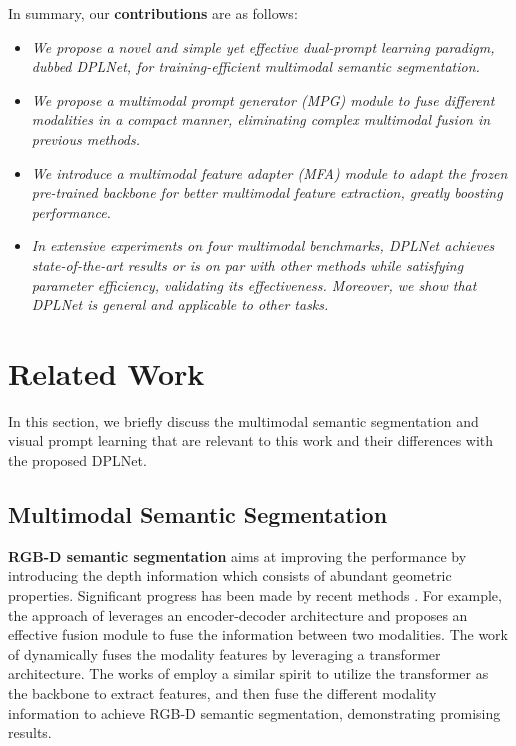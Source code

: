 \documentclass[10pt,twocolumn,letterpaper]{article}
\begin{document}
In summary, our \textbf{contributions} are as follows:
\vspace{0.1em}
\begin{itemize}
\setlength{\itemsep}{2pt}
\setlength{\parsep}{2pt}
\setlength{\parskip}{2pt}

      \item[] \emph{We propose a novel and simple yet effective dual-prompt learning paradigm, dubbed DPLNet, for training-efficient multimodal semantic segmentation.
      }
      
      \item[] \emph{We propose a multimodal prompt generator (MPG) module to fuse different modalities in a compact manner, eliminating complex multimodal fusion in previous methods.}

      \item[] \emph{We introduce a multimodal feature adapter (MFA) module to adapt the frozen pre-trained backbone for better multimodal feature extraction, greatly boosting performance.}
      
      \item[] \emph{In extensive experiments on four multimodal benchmarks, DPLNet achieves state-of-the-art results or is on par with other methods while satisfying parameter efficiency, validating its effectiveness. Moreover, we show that DPLNet is general and applicable to other tasks.}
\end{itemize}



\section{Related Work}
\label{sec:rel}

In this section, we briefly discuss the multimodal semantic segmentation and visual prompt learning that are relevant to this work and their differences with the proposed DPLNet.

\subsection{Multimodal Semantic Segmentation}

\noindent
\textbf{RGB-D semantic segmentation} aims at improving the performance by introducing the depth information which consists of abundant geometric properties. Significant progress has been made by recent methods \cite{acnet, SGNet, SA-gate, cen, shapeconv, frnet, pgdenet, tokenfusion, multimae, omnivore, CMX, CMNext}. For example, the approach of \cite{acnet} leverages an encoder-decoder architecture and proposes an effective fusion module to fuse the information between two modalities. The work of \cite{tokenfusion} dynamically fuses the modality features by leveraging a transformer architecture. The works of \cite{CMX,CMNext} employ a similar spirit to utilize the transformer as the backbone to extract features, and then fuse the different modality information to achieve RGB-D semantic segmentation, demonstrating promising results. 
\end{document}
